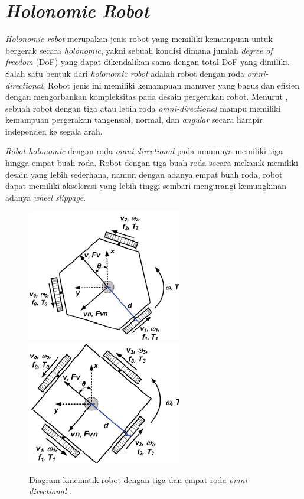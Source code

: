 \section{\emph{Holonomic Robot}}
\label{sec:holonomicrobot}

\emph{Holonomic robot} merupakan jenis robot yang memiliki kemampuan untuk bergerak secara \emph{holonomic},
  yakni sebuah kondisi dimana jumlah \emph{degree of freedom} (DoF) yang dapat dikendalikan sama dengan total DoF yang dimiliki.
Salah satu bentuk dari \emph{holonomic robot} adalah robot dengan roda \emph{omni-directional}.
Robot jenis ini memiliki kemampuan manuver yang bagus dan efisien dengan mengorbankan kompleksitas pada desain pergerakan robot.
Menurut \citet{cit:oliveira2008},
  sebuah robot dengan tiga atau lebih roda \emph{omni-directional} mampu memiliki kemampuan pergerakan tangensial, normal, dan \emph{angular} secara hampir independen ke segala arah.

\emph{Robot holonomic} dengan roda \emph{omni-directional} pada umumnya memiliki tiga hingga empat buah roda.
Robot dengan tiga buah roda secara mekanik memiliki desain yang lebih sederhana,
  namun dengan adanya empat buah roda,
  robot dapat memiliki akselerasi yang lebih tinggi sembari mengurangi kemungkinan adanya \emph{wheel slippage}.

\begin{figure}[ht]
  \centering
  \includegraphics[height=0.3\textwidth,keepaspectratio]{gambar/diagram-robot-tiga-roda.png}
  \includegraphics[height=0.3\textwidth,keepaspectratio]{gambar/diagram-robot-empat-roda.png}
  \caption{Diagram kinematik robot dengan tiga dan empat roda \emph{omni-directional} \citep{cit:oliveira2008}.}
  \label{fig:diagramkinematikrobot}
\end{figure}

